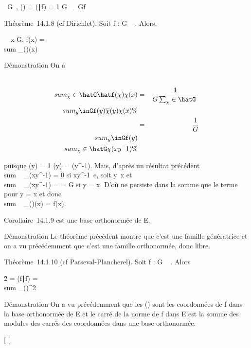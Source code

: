 \documentclass[]{article}
\begin{document}
\forall~\chi \in\hat G~,
\hatf(\chi) = (\chi∣f) =
1\over
G\int ~
_Gf\overline\chi

Théorème~14.1.8 (cf Dirichlet). Soit f : G \rightarrow~ . Alors,

\forall~~x \in G, f(x) = \\sum
_\chi\in\hatG\hatf(\chi)\chi(x)

Démonstration On a

\begin{align*} \\sum
_\chi\in\hatG\hatf(\chi)\chi(x)&
=& 1 \over G
\sum _\chi\in\hatG~
\\sum
_y\inGf(y)\overline\chi(y)\chi(x)\%&
\\ & =& 1 \over
G \\sum
_y\inGf(y)\\sum
_\chi\in\hatG\chi(xy^-1) \%&
\\ \end{align*}

puisque \overline\chi(y) = 1 \over
\chi(y) = \chi(y^-1). Mais, d'après un résultat précédent
\\sum ~
_\chi\in\hatG\chi(xy^-1) = 0 si
xy^-1\neq~e, soit
y\neq~x et
\\sum ~
_\chi\in\hatG\chi(xy^-1) =
\hatG = G si
y = x. D'où ne persiste dans la somme que le terme pour y = x et donc
\\sum ~
_\chi\in\hatG\hatf(\chi)\chi(x) =
f(x).

Corollaire~14.1.9 \hatG est une base orthonormée de
E.

Démonstration Le théorème précédent montre que c'est une famille
génératrice et on a vu précédemment que c'est une famille orthonormée,
donc libre.

Théorème~14.1.10 (cf Parseval-Plancherel). Soit f : G \rightarrow~ . Alors

\f\^2 =
(f∣f) = \\sum
_\chi\in\hatG\hatf(\chi)^2

Démonstration On a vu précédemment que les \hatf(\chi)
sont les coordonnées de f dans la base orthonormée
\hatG de E et le carré de la norme de f dans E est la
somme des modules des carrés des coordonnées dans une base orthonormée.

[
[
\end{document}
